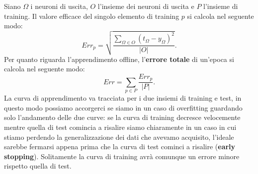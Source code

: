 \documentclass[12pt, twoside, letterpaper]{report}
\begin{document}
				Siano $\Omega$ i neuroni di uscita, $O$ l'insieme dei neuroni di uscita e $P$ l'insieme di training. Il valore efficace del singolo elemento di training $p$ si calcola nel seguente modo: $$Err_p = \sqrt{\frac{\sum_{\Omega \in O} (t_{\Omega} - y_{\Omega})^2}{|O|}}.$$
				Per quanto riguarda l'apprendimento offline, l'\textbf{errore totale} di un'epoca si calcola nel seguente modo: $$Err = \sum_{p \in P} \frac{Err_p}{|P|}.$$ 
				La curva di apprendimento va tracciata per i due insiemi di training e test, in questo modo possiamo accorgerci se siamo in un caso di overfitting guardando solo l'andamento delle due curve: se la curva di training decresce velocemente mentre quella di test comincia a risalire siamo chiaramente in un caso in cui stiamo perdendo la generalizzazione dei dati che avevamo acquisito, l'ideale sarebbe fermarsi appena prima che la curva di test cominci a risalire (\textbf{early stopping}). Solitamente la curva di training avrà comunque un errore minore rispetto quella di test.
\end{document}
